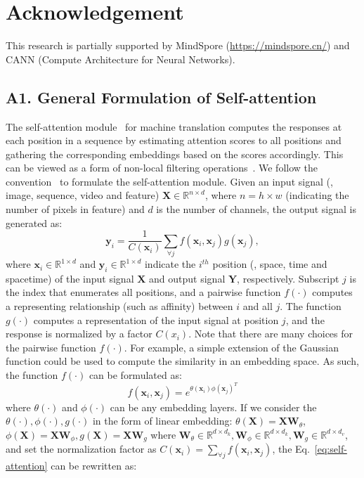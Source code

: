 \section*{Acknowledgement}
This research is partially supported by MindSpore (\url{https://mindspore.cn/}) and CANN (Compute Architecture for Neural Networks).
\appendix
\subsection*{A1. General Formulation of Self-attention}
\label{sec:formulation-sa}
The self-attention module~ for machine translation computes the responses at each position in a sequence by estimating attention scores to all positions and gathering the corresponding embeddings based on the scores accordingly. This can be viewed as a form of non-local filtering operations~. We follow the convention~ to formulate the self-attention module. Given an input signal (\eg, image, sequence, video and feature) $\mathbf X\in \mathbb{R}^{n\times d}$, where $n=h\times w$ (indicating the number of pixels in feature) and $d$ is the number of channels, the output signal is generated as:
\begin{equation}
	\mathbf y_i = \frac{1}{C(\mathbf x_i)}\sum_{\forall j}{f(\mathbf x_i, \mathbf x_j)g(\mathbf x_j)},
	\label{eq:self-attention}
\end{equation}
where $\mathbf x_i\in \mathbb{R}^{1\times d}$ and $\mathbf y_i\in \mathbb{R}^{1\times d}$ indicate the $i^{th}$ position (\eg, space, time and spacetime) of the input signal $\mathbf X$ and output signal $\mathbf Y$, respectively. Subscript $j$ is the index that enumerates all positions, and a pairwise function $f(\cdot)$ computes a representing relationship (such as affinity) between $i$ and all $j$. The function $g(\cdot)$ computes a representation of the input signal at position $j$, and the response is normalized by a factor $C(x_i)$.
Note that there are many choices for the pairwise function $f(\cdot)$. For example, a simple extension of the Gaussian function could be used to compute the similarity in an embedding space. As such, the function $f(\cdot)$ can be formulated as:
\begin{equation}
	f(\mathbf x_i, \mathbf x_j) = e^{\theta(\mathbf x_i)\phi(\mathbf x_j)^T}
\end{equation}
where $\theta(\cdot)$ and $\phi(\cdot)$ can be any embedding layers. If we consider the $\theta(\cdot), \phi(\cdot), g(\cdot)$ in the form of linear embedding: $\theta(\mathbf X)=\mathbf X\mathbf W_{\theta}$, $\phi(\mathbf X)=\mathbf X\mathbf W_{\phi}, g(\mathbf X)=\mathbf X\mathbf W_g$ where $\mathbf W_{\theta}\in \mathbb{R}^{d\times d_k}, \mathbf W_{\phi}\in \mathbb{R}^{d\times d_k}, \mathbf W_g\in \mathbb{R}^{d\times d_v}$, and set the normalization factor as $C(\mathbf x_i)=\sum_{\forall j}{f(\mathbf x_i, \mathbf x_j)}$, the Eq.~\ref{eq:self-attention} can be rewritten as:
